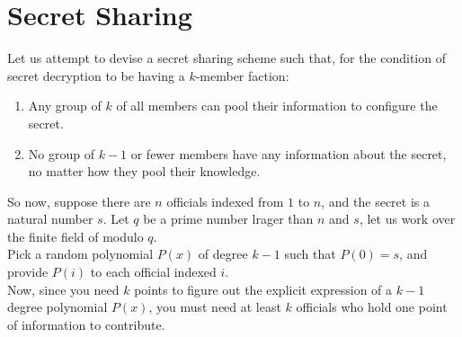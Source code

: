 \section{Secret Sharing}
Let us attempt to devise a secret sharing scheme such that, for the condition of secret decryption to be having a $k$-member faction:
\begin{enumerate}
    \item Any group of $k$ of all members can pool their information to configure the secret.
    \item No group of $k - 1$ or fewer members have any information about the secret, no matter how they pool their knowledge.
\end{enumerate}
So now, suppose there are $n$ officials indexed from $1$ to $n$, and the secret is a natural number $s$. Let $q$ be a prime number lrager than $n$ and $s$, let us work over the finite field of modulo $q$. \\
Pick a random polynomial $P(x)$ of degree $k - 1$ such that $P(0) = s$, and provide $P(i)$ to each official indexed $i$. \\
Now, since you need $k$ points to figure out the explicit expression of a $k - 1$ degree polynomial $P(x)$, you must need at least $k$ officials who hold one point of information to contribute.

